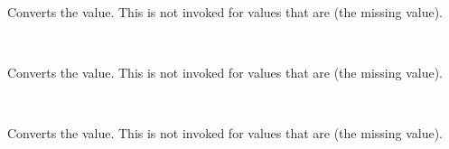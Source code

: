 \documentclass[letterpaper,10pt,english,openany,oneside]{sphinxmanual}
\begin{document}
\begin{fulllineitems}
\label{\detokenize{api:spookyconsole.ntutils.NTEntryParamType}}~

\begin{fulllineitems}
\label{\detokenize{api:spookyconsole.ntutils.NTEntryParamType.convert}}
Converts the value.  This is not invoked for values that are
 (the missing value).

\end{fulllineitems}


\end{fulllineitems}


\begin{fulllineitems}
\label{\detokenize{api:spookyconsole.ntutils.NTPathParamType}}~

\begin{fulllineitems}
\label{\detokenize{api:spookyconsole.ntutils.NTPathParamType.convert}}
Converts the value.  This is not invoked for values that are
 (the missing value).

\end{fulllineitems}


\end{fulllineitems}


\begin{fulllineitems}
\label{\detokenize{api:spookyconsole.ntutils.NTTableParamType}}~

\begin{fulllineitems}
\label{\detokenize{api:spookyconsole.ntutils.NTTableParamType.convert}}
Converts the value.  This is not invoked for values that are
 (the missing value).

\end{fulllineitems}


\end{fulllineitems}
\end{document}
